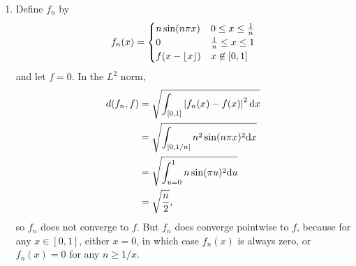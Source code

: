 \documentclass{article}
\begin{document}
\begin{enumerate}[label=(\alph*)]
    \item Define $f_n$ by
        \[ f_n(x) = \begin{cases}
            n \sin(n \pi x) & 0 \leq x \leq \frac{1}{n} \\
            0 & \frac{1}{n} \leq x \leq 1 \\
            f(x-\left\lfloor x \right\rfloor) & x \not\in [0,1]
        \end{cases} \]
        and let $f=0$. In the $L^2$ norm,
        \begin{align*}
        d(f_n, f) &= \sqrt{ \int_{[0,1]} \left\lvert f_n(x)-f(x) \right\rvert^2 \mathrm{d} x } \\
                  &= \sqrt{ \int_{[0,1/n]} n^2 \sin(n \pi x)^2 \mathrm{d} x } \\
                  &= \sqrt{ \int_{u=0}^1 n \sin(\pi u)^2 \mathrm{d} u } \\
                  &= \sqrt{ \frac{n}{2}},
        \end{align*}
        so $f_n$ does not converge to $f$. But $f_n$ does converge pointwise to $f$, because for any $x \in [0,1]$, either $x=0$, in which case $f_n(x)$ is always zero, or $f_n(x)=0$ for any $n \geq 1/x$.
        
\end{enumerate}


\end{document}
